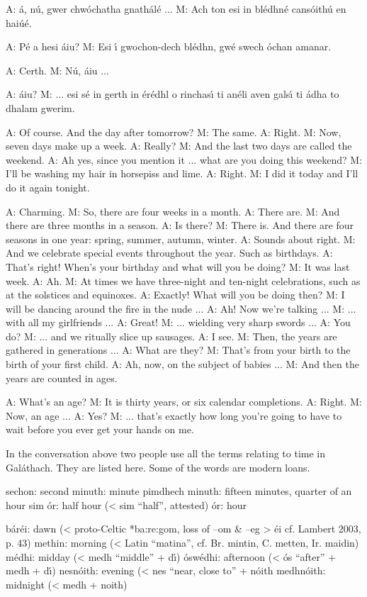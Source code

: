A: \'{a}, n\'{u}, gwer chw\'{o}chatha gnath\'{a}l\'{e} ...
M: Ach ton esi in bl\'{e}dhn\'{e} cans\'{o}ith\'{u} en hai\'{u}\'{e}.

A: P\'{e} a hesi \'{a}iu?
M: Esi \'{\i} gwochon-dech bl\'{e}dhn, gw\'{e} swech \'{o}chan amanar.

A: Certh.
M: N\'{u}, \'{a}iu ...

A: \'{a}iu?
M: ... esi s\'{e} in gerth in \'{e}r\'{e}dhl o rinchas\'{\i} ti an\'{e}li aven gals\'{\i} ti \'{a}dha to dhalam gwerim.

A: Of course. And the day after tomorrow?
M: The same.
A: Right.
M: Now, seven days make up a week.
A: Really?
M: And the last two days are called the weekend.
A: Ah yes, since you mention it ... what are you doing this weekend?
M: I’ll be washing my hair in horsepiss and lime.
A: Right.
M: I did it today and I’ll do it again tonight.

A: Charming.
M: So, there are four weeks in a month.
A: There are.
M: And there are three months in a season.
A: Is there?
M: There is. And there are four seasons in one year: spring, summer, autumn, winter.
A: Sounds about right.
M: And we celebrate special events throughout the year. Such as birthdays.
A: That’s right! When’s your birthday and what will you be doing?
M: It was last week.
A: Ah.
M: At times we have three-night and ten-night celebrations, such as at the solstices and equinoxes.
A: Exactly! What will you be doing then?
M: I will be dancing around the fire in the nude ...
A: Ah! Now we’re talking ...
M: ... with all my girlfriends ...
A: Great!
M: ... wielding very sharp swords ...
A: You do?
M: ... and we ritually slice up sausages.
A: I see.
M: Then, the years are gathered in generations ...
A: What are they?
M: That’s from your birth to the birth of your first child.
A: Ah, now, on the subject of babies ...
M: And then the years are counted in ages.

A: What’s an age?
M: It is thirty years, or six calendar completions.
A: Right.
M: Now, an age ...
A: Yes?
M: ... that’s exactly how long you’re going to have to wait before you ever get your hands on me.

In the conversation above two people use all the terms relating to time in Gal\'{a}thach. They are listed here. Some of the words are modern loans.

sechon: second 
minuth: minute 
pimdhech minuth: fifteen minutes, quarter of an hour 
sim \'{o}r: half hour (< sim “half”, attested)
\'{o}r: hour 

b\'{a}r\'{e}i: dawn (< proto-Celtic *ba:re:gom, loss of –om \& –eg > \'{e}i cf. Lambert 2003, p. 43)
methin: morning (< Latin “matina”, cf. Br. mintin, C. metten, Ir. maidin)
m\'{e}dhi: midday (< medh “middle” + d\'{\i})
\'{o}sw\'{e}dhi: afternoon (< \'{o}s “after” + medh + d\'{\i})
nesn\'{o}ith: evening (< nes “near, close to” + n\'{o}ith
medhn\'{o}ith: midnight (< medh + noith)

